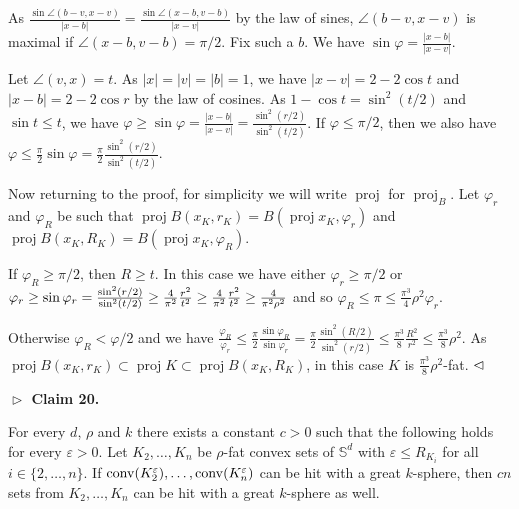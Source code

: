 \par
\par
As $\frac{\sin\angle(b-v,x-v)}{|x-b|}=\frac{\sin\angle(x-b,v-b)}{|x-v|}$ by the law of sines, $\angle(b-v,x-v)$ is maximal if $\angle(x-b,v-b)=\pi/2$. Fix such a $b$. We have $\sin\varphi=\frac{|x-b|}{|x-v|}$.
\par
\par
Let $\angle(v,x)=t$. As $|x|=|v|=|b|=1$, we have $|x-v|=2-2\cos t$ and $|x-b|=2-2\cos r$ by the law of cosines. As $1-\cos t=\sin^{2}(t/2)$ and $\sin t\leq t$, we have $\varphi\geq\sin\varphi=\frac{|x-b|}{|x-v|}=\frac{\sin^{2}(r/2)}{\sin^{2}(t/2)}$. If $\varphi\leq\pi/2$, then we also have $\varphi\leq\frac{\pi}{2}\sin\varphi=\frac{\pi}{2}\frac{\sin^{2}(r/2)}{\sin^{2}%
(t/2)}$.
\par
\par
Now returning to the proof, for simplicity we will write $\operatorname{proj}$ for $\operatorname{proj}_{B}$. Let $\varphi_{r}$ and $\varphi_{R}$ be such that $\operatorname{proj}B(x_{K},r_{K})=B(\operatorname{proj}x_{K},\varphi_{r})$ and $\operatorname{proj}B(x_{K},R_{K})=B(\operatorname{proj}x_{K},\varphi_{R})$.
\par
\par
If $\varphi_{R}\geq\pi/2$, then $R\geq t$. In this case we have either $\varphi_{r}\geq\pi/2$ or $\varphi_{r}\geq\sin\varphi_{r}=\frac{\sin^{2}(r/2)}{\sin^{2}(t/2)}\geq\frac{4}%
{\pi^{2}}\frac{r^{2}}{t^{2}}\geq\frac{4}{\pi^{2}}\frac{r^{2}}{t^{2}}\geq\frac{%
4}{\pi^{2}\rho^{2}}$ and so $\varphi_{R}\leq\pi\leq\frac{\pi^{3}}{4}\rho^{2}\varphi_{r}$.
\par
\par
Otherwise $\varphi_{R}<\varphi/2$ and we have $\frac{\varphi_{R}}{\varphi_{r}}\leq\frac{\pi}{2}\frac{\sin\varphi_{R}}{\sin%
\varphi_{r}}=\frac{\pi}{2}\frac{\sin^{2}(R/2)}{\sin^{2}(r/2)}\leq\frac{\pi^{3}%
}{8}\frac{R^{2}}{r^{2}}\leq\frac{\pi^{3}}{8}\rho^{2}$. As $\operatorname{proj}B(x_{K},r_{K})\subset\operatorname{proj}K\subset%
\operatorname{proj}B(x_{K},R_{K})$, in this case $K$ is $\frac{\pi^{3}}{8}\rho^{2}$-fat. $\hfill\vartriangleleft$
\par
\par
\par\medskip\noindent\textbf{$\vartriangleright$ Claim 20.}\par
For every $d$, $\rho$ and $k$ there exists a constant $c>0$ such that the following holds for every $\varepsilon>0$. Let $K_{2},\ldots,K_{n}$ be $\rho$-fat convex sets of $\mathbb{S}^{d}$ with $\varepsilon\leq R_{K_{i}}$ for all $i\in\{2,\ldots,n\}$. If $\operatorname{conv}(K_{2}^{\varepsilon}),\ldots,\operatorname{conv}(K_{n}^{%
\varepsilon})$ can be hit with a great $k$-sphere, then $cn$ sets from $K_{2},\ldots,K_{n}$ can be hit with a great $k$-sphere as well.
